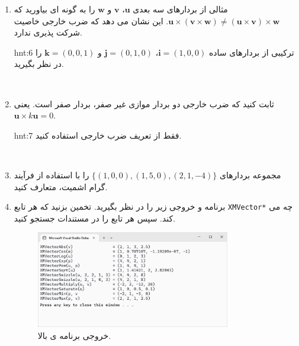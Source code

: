 {\begin{spacing}{1.5}
\begin{enumerate}[label=\textbf{\arabic*}.]
\begin{figure}[H]
                \caption {متوازی الاضلاع توسط دو بردار سه بعدی $\textbf{u}$ و $\textbf{v}$. متوازی الاضلاع دارای پایه $\norm{\textbf{v}}$ و ارتفاع $\textbf{h}$ است.}
                \label{fig:4.Session.1.1.21}
            \end{figure}
            \\
            \item {مثالی از بردارهای سه بعدی $\textbf{u}$، $\textbf{v}$ و $\textbf{w}$ را به گونه ای بیاورید که $\textbf{u}\times(\textbf{v}\times\textbf{w})\neq(\textbf{u}\times\textbf{v})\times\textbf{w}$. این نشان می دهد که ضرب خارجی خاصیت شرکت پذیری ندارد.}
            \begin{hint}{hnt:6}
                \Large
                ترکیبی از بردارهای ساده $\textbf{i}=(1,0,0)$، $\textbf{j}=(0,1,0)$ و $\textbf{k}=(0,0,1)$ را در نظر بگیرید.
            \end{hint}
            \\
            \item {ثابت کنید که ضرب خارجی دو بردار موازی غیر صفر، بردار صفر است. یعنی $\textbf{u}\times k\textbf{u}=0$.}
            \begin{hint}{hnt:7}
                \Large
                فقط از تعریف ضرب خارجی استفاده کنید.
            \end{hint}
            \\
            \item {مجموعه بردارهای $\{(1, 0, 0), (1, 5, 0), (2, 1, -4)\}$ را با استفاده از فرآیند گرام اشمیت، متعارف کنید.}
            \\
            \item {برنامه و خروجی زیر را در نظر بگیرید.
            تخمین بزنید که هر تابع \texttt{XMVector*} چه می کند. سپس هر تابع را در مستندات  جستجو کنید.}
            \textbf{\vspace{6pt}}
            \lr{}
            \textbf{\vspace{-40pt}}
            \begin{figure}[H]
                \centering
                \setlength{\belowcaptionskip}{-10pt}
                \includegraphics[width=0.8\textwidth]{Images/4/4.Session.1.1.22}
                \caption {خروجی برنامه ی بالا.}
                \label{fig:4.Session.1.1.22}
            \end{figure}
        \end{enumerate}
    \end{spacing}
}
